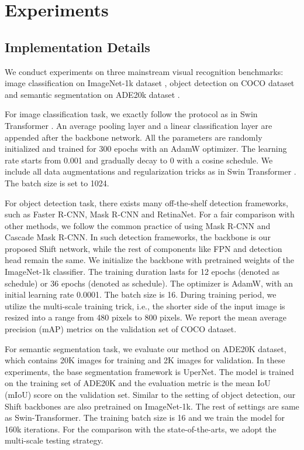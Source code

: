 \documentclass[letterpaper]{article} \usepackage{aaai22}  \usepackage{times}  \usepackage{helvet}  \usepackage{courier}  \usepackage[hyphens]{url}  \usepackage{graphicx} \usepackage{amsmath}
\begin{document}
\section{Experiments}

\subsection{Implementation Details}

We conduct experiments on three mainstream visual recognition benchmarks: image classification on ImageNet-1k dataset \cite{ImageNet}, object detection on COCO dataset \cite{COCO} and semantic segmentation on ADE20k dataset \cite{ADE20K}. 

For image classification task, we exactly follow the protocol as in Swin Transformer \cite{Swin}. An average pooling layer and a linear classification layer are appended after the backbone network. All the parameters are randomly initialized and trained for 300 epochs with an AdamW optimizer. The learning rate starts from 0.001 and gradually decay to 0 with a cosine schedule. We include all data augmentations and regularization tricks as in Swin Transformer \cite{Swin}. The batch size is set to 1024.

For object detection task, there exists many off-the-shelf detection frameworks, such as Faster R-CNN, Mask R-CNN and RetinaNet. For a fair comparison with other methods, we follow the common practice of using Mask R-CNN and Cascade Mask R-CNN. In such detection frameworks, the backbone is our proposed Shift network, while the rest of components like FPN and detection head remain the same. We initialize the backbone with pretrained weights of the ImageNet-1k classifier. The training duration lasts for 12 epochs (denoted as  schedule) or 36 epochs (denoted as  schedule). The optimizer is AdamW, with an initial learning rate 0.0001. The batch size is 16. During training period, we utilize the multi-scale training trick, i.e., the shorter side of the input image is resized into a range from 480 pixels to 800 pixels. We report the mean average precision (mAP) metrics on the validation set of COCO dataset.

For semantic segmentation task, we evaluate our method on ADE20K dataset, which contains 20K images for training and 2K images for validation. In these experiments, the base segmentation framework is UperNet. The model is trained on the training set of ADE20K and the evaluation metric is the mean IoU (mIoU) score on the validation set. Similar to the setting of object detection, our Shift backbones are also pretrained on ImageNet-1k. The rest of settings are same as Swin-Transformer. The training batch size is 16 and we train the model for 160k iterations. For the comparison with the state-of-the-arts, we adopt the multi-scale testing strategy.
\end{document}
